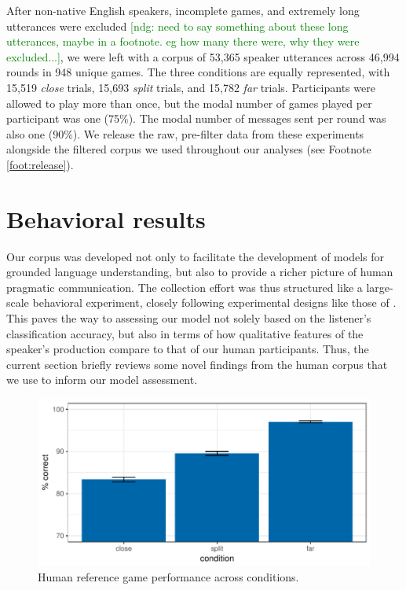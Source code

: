 \documentclass[11pt,letterpaper]{article}
\renewcommand{\|}{\mid}
\newcommand{\ndg}[1]{\textcolor{Green}{[ndg: #1]}}
\begin{document}
After non-native English speakers, incomplete games, and extremely long utterances were excluded \ndg{need to say something about these long utterances, maybe in a footnote. eg how many there were, why they were excluded...}, we were left with a corpus of 53,365 speaker utterances across 46,994 rounds in 948 unique games. The three conditions are equally represented, with 15,519 \emph{close} trials, 15,693 \emph{split} trials, and 15,782 \emph{far} trials. Participants were allowed to play more than once, but the modal number of games played per participant was one (75\%). The modal number of messages sent per round was also one (90\%). We release the raw, pre-filter data from these experiments alongside the filtered corpus we used throughout our analyses (see Footnote
\ref{foot:release}).

\section{Behavioral results}

Our corpus was developed not only to facilitate the development of
models for grounded language understanding, but also to provide a
richer picture of human pragmatic communication. The collection effort
was thus structured like a large-scale behavioral experiment, closely
following experimental designs like those of
. This paves the way to assessing our
model not solely based on the listener's classification accuracy, but also in terms of how
qualitative features of the speaker's production compare to that of our human participants. 
Thus, the current section briefly reviews some novel findings from the human
corpus that we use to inform our model assessment.

\begin{figure}
\includegraphics[scale = .5]{figures/listenerAccuracy}
\caption{Human reference game performance across conditions.}
\label{fig:listenerAccuracy}
\end{figure}
\end{document}
